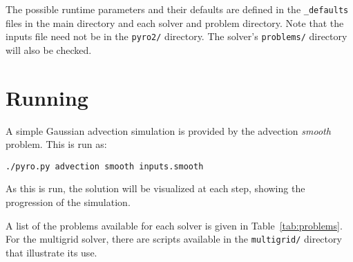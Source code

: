 The possible runtime parameters and their defaults are defined in the
{\tt \_defaults} files in the main directory and each solver and
problem directory.  Note that the inputs file need not be in the 
{\tt pyro2/} directory.  The solver's {\tt problems/} directory
will also be checked.

\section{Running \pyro}

A simple Gaussian advection simulation is provided by the advection
{\em smooth} problem.  This is run as:
\begin{verbatim}
./pyro.py advection smooth inputs.smooth
\end{verbatim}
As this is run, the solution will be visualized at each step,
showing the progression of the simulation.  


A list of the problems available for each solver is given in
Table~\ref{tab:problems}.  For the multigrid solver, there are scripts
available in the {\tt multigrid/} directory that illustrate its use.



